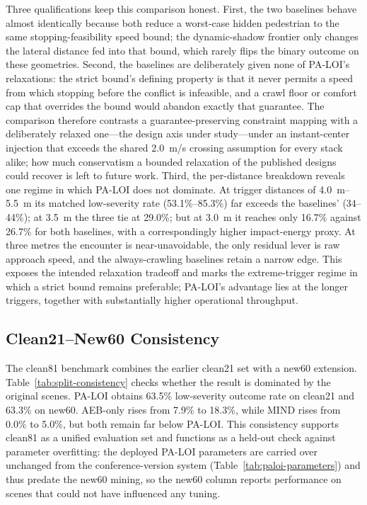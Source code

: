 \documentclass[journal]{IEEEtran}
\begin{document}
Three qualifications keep this comparison honest. First, the two baselines behave almost identically because both reduce a worst-case hidden pedestrian to the same stopping-feasibility speed bound; the dynamic-shadow frontier only changes the lateral distance fed into that bound, which rarely flips the binary outcome on these geometries. Second, the baselines are deliberately given none of PA-LOI's relaxations: the strict bound's defining property is that it never permits a speed from which stopping before the conflict is infeasible, and a crawl floor or comfort cap that overrides the bound would abandon exactly that guarantee. The comparison therefore contrasts a guarantee-preserving constraint mapping with a deliberately relaxed one---the design axis under study---under an instant-center injection that exceeds the shared \SI{2.0}{m/s} crossing assumption for every stack alike; how much conservatism a bounded relaxation of the published designs could recover is left to future work. Third, the per-distance breakdown reveals one regime in which PA-LOI does not dominate. At trigger distances of \SIrange{4.0}{5.5}{m} its matched low-severity rate (53.1\%--85.3\%) far exceeds the baselines' (34--44\%); at \SI{3.5}{m} the three tie at 29.0\%; but at \SI{3.0}{m} it reaches only 16.7\% against 26.7\% for both baselines, with a correspondingly higher impact-energy proxy. At three metres the encounter is near-unavoidable, the only residual lever is raw approach speed, and the always-crawling baselines retain a narrow edge. This exposes the intended relaxation tradeoff and marks the extreme-trigger regime in which a strict bound remains preferable; PA-LOI's advantage lies at the longer triggers, together with substantially higher operational throughput.

\subsection{Clean21--New60 Consistency}



The clean81 benchmark combines the earlier clean21 set with a new60 extension. Table~\ref{tab:split-consistency} checks whether the result is dominated by the original scenes. PA-LOI obtains 63.5\% low-severity outcome rate on clean21 and 63.3\% on new60. AEB-only rises from 7.9\% to 18.3\%, while MIND rises from 0.0\% to 5.0\%, but both remain far below PA-LOI. This consistency supports clean81 as a unified evaluation set and functions as a held-out check against parameter overfitting: the deployed PA-LOI parameters are carried over unchanged from the conference-version system (Table~\ref{tab:paloi-parameters}) and thus predate the new60 mining, so the new60 column reports performance on scenes that could not have influenced any tuning.
\end{document}
